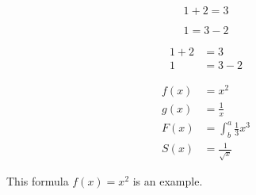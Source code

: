 \documentclass{article}
\begin{document}
\begin{equation*}
  1 + 2 = 3 
\end{equation*}

\begin{equation*}
  1 = 3 - 2
\end{equation*}

\begin{align*}
  1 + 2 &= 3\\
  1 &= 3 - 2
\end{align*}

\begin{align*}
  f(x) &= x^2\\
  g(x) &= \frac{1}{x}\\
  F(x) &= \int^a_b \frac{1}{3}x^3\\
  S(x) &=\frac{1}{\sqrt{x}}
\end{align*}

This formula $f(x) = x^2$ is an example.
\end{document}

